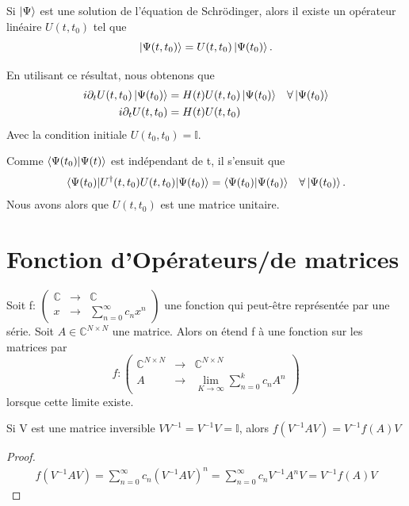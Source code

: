 \documentclass[../notesdecours.tex]{subfiles}
\begin{document}
\begin{Property} Si $\ket{\Psi}$ est une solution de l'équation de Schrödinger, alors il existe un opérateur linéaire $U(t,t_0)$ tel que
\begin{equation}
\ket{\Psi (t,t_0)} = U(t,t_0)\ket{\Psi(t_0)}.
\end{equation} \label{1}\end{Property}

En utilisant ce résultat, nous obtenons que
\begin{align*}
i\partial_t U(t,t_0)\ket{\Psi(t_0)} &= H(t)U(t,t_0)\ket{\Psi(t_0)}		&\forall\ket{\Psi(t_0)}\\
i\partial_t U(t,t_0) &= H(t)U(t,t_0)
\end{align*}
Avec la condition initiale $U(t_0,t_0) = \mathbb{I}$.\\

\begin{Property} Comme $\braket{\Psi(t_0)|\Psi(t)}$ est indépendant de t, il s'ensuit que 
\begin{align}
\braket{\Psi(t_0)|U^\dag (t,t_0)U(t,t_0)|\Psi(t_0)} &= \braket{\Psi(t_0)|\Psi(t_0)}		&\forall\ket{\Psi(t_0)}.
\end{align}
Nous avons alors que $U(t,t_0)$ est une matrice unitaire. \end{Property}

\section{Fonction d'Opérateurs/de matrices}
Soit f: $\begin{pmatrix}
\mathbb{C} & \rightarrow & \mathbb{C}\\
x & \rightarrow & \sum_{n = 0}^{\infty} c_nx^n
\end{pmatrix}$ une fonction qui peut-être représentée par une série. Soit $A\in\mathbb{C}^{N\times N}$ une matrice. Alors on étend f à une fonction sur les matrices par
\begin{equation}
f: \begin{pmatrix}
\mathbb{C}^{N\times N} & \rightarrow & \mathbb{C}^{N\times N}\\
A & \rightarrow & \lim_{K\to\infty} \sum_{n = 0}^{k} c_n A^n
\end{pmatrix}
\end{equation}
lorsque cette limite existe.

\begin{Property} Si V est une matrice inversible $VV^{-1} = V^{-1}V = \mathbb{I}$, alors $f(V^{-1}AV) = V^{-1}f(A)V$ \end{Property}
\begin{proof}
\begin{align*}
f(V^{-1}AV) = \sum_{n = 0}^{\infty} c_n (V^{-1}AV)^n = \sum_{n = 0}^{\infty} c_n V^{-1} A^n V = V^{-1}f(A)V
\end{align*}
\end{proof}
\end{document}
